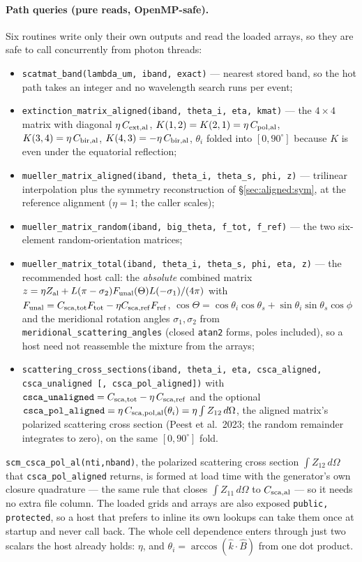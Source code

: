 \documentclass{my_memo}
\newcommand{\code}[1]{\texttt{#1}}
\begin{document}
\paragraph{Path queries (pure reads, OpenMP-safe).} Six routines write only their
own outputs and read the loaded arrays, so they are safe to call concurrently from
photon threads:
\begin{itemize}
\item \code{scatmat\_band(lambda\_um, iband, exact)} --- nearest stored band, so
      the hot path takes an integer and no wavelength search runs per event;
\item \code{extinction\_matrix\_aligned(iband, theta\_i, eta, kmat)} --- the
      $4\times4$ matrix with diagonal $\eta\,C_{\rm ext,al}$,
      $K(1,2)=K(2,1)=\eta\,C_{\rm pol,al}$, $K(3,4)=\eta\,C_{\rm bir,al}$,
      $K(4,3)=-\eta\,C_{\rm bir,al}$, $\theta_i$ folded into $[0,90^\circ]$ because
      $K$ is even under the equatorial reflection;
\item \code{mueller\_matrix\_aligned(iband, theta\_i, theta\_s, phi, z)} ---
      trilinear interpolation plus the symmetry reconstruction of
      \S\ref{sec:aligned:sym}, at the reference alignment ($\eta=1$; the caller
      scales);
\item \code{mueller\_matrix\_random(iband, big\_theta, f\_tot, f\_ref)} --- the two
      six-element random-orientation matrices;
\item \code{mueller\_matrix\_total(iband, theta\_i, theta\_s, phi, eta, z)} --- the
      recommended host call: the \emph{absolute} combined matrix
      $z=\eta Z_{\rm al}+L(\pi-\sigma_2)F_{\rm unal}(\Theta)L(-\sigma_1)/(4\pi)$
      with $F_{\rm unal}=C_{\rm sca,tot}F_{\rm tot}-\eta C_{\rm sca,ref}F_{\rm ref}$,
      $\cos\Theta=\cos\theta_i\cos\theta_s+\sin\theta_i\sin\theta_s\cos\phi$ and the
      meridional rotation angles $\sigma_1,\sigma_2$ from
      \code{meridional\_scattering\_angles} (closed \code{atan2} forms, poles
      included), so a host need not reassemble the mixture from the arrays;
\item \code{scattering\_cross\_sections(iband, theta\_i, eta, csca\_aligned,
      csca\_unaligned [, csca\_pol\_aligned])} with $\code{csca\_unaligned}=
      C_{\rm sca,tot}-\eta\,C_{\rm sca,ref}$ and the optional
      $\code{csca\_pol\_aligned}=\eta\,C_{\rm sca,pol,al}(\theta_i)=\eta\int
      Z_{12}\,d\Omega$, the aligned matrix's polarized scattering cross section
      (Peest et al.\ 2023; the random remainder integrates to zero), on the same
      $[0,90^\circ]$ fold.
\end{itemize}
\code{scm\_csca\_pol\_al(nti,nband)}, the polarized scattering cross section
$\int Z_{12}\,d\Omega$ that \code{csca\_pol\_aligned} returns, is formed at load
time with the generator's own closure quadrature --- the same rule that closes
$\int Z_{11}\,d\Omega$ to $C_{\rm sca,al}$ --- so it needs no extra file column.
The loaded grids and arrays are also exposed \code{public, protected}, so a host
that prefers to inline its own lookups can take them once at startup and never
call back. The whole cell dependence enters through just two scalars the host
already holds: $\eta$, and $\theta_i=\arccos(\hat k\!\cdot\!\hat B)$ from one dot
product.
\end{document}
